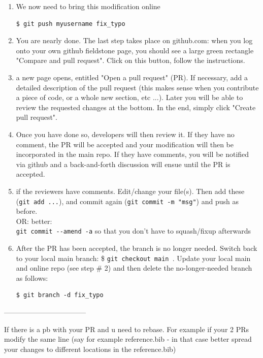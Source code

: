 \begin{enumerate}
\item We now need to bring this modification online 
\begin{verbatim}
$ git push myusername fix_typo
\end{verbatim}

\item You are nearly done. The last step takes place on github.com: when you log onto 
your own github fieldstone page, you should see a large green rectangle "Compare and pull request".
Click on this button, follow the instructions.

\item a new page opens, entitled "Open a pull request" (PR). If necessary, add a detailed description of 
the pull request (this makes sense when you contribute a piece of code, or a whole new section, etc ...).
Later you will be able to review the requested changes at the bottom. In the end, simply click "Create pull request".

\item Once you have done so, \aspect developers will then review it. 
If they have no comment, the PR will be accepted and your modification will 
then be incorporated in the main repo. If they have comments, you will be notified via github and a 
back-and-forth discussion will ensue until the PR is accepted. 

\item if the reviewers have comments. Edit/change your file(s). 
Then add these (\verb'git add ...'), and commit again (\verb'git commit -m "msg"')
and push as before. \\
OR: better: \\
\verb'git commit --amend -a' so that you don't have to squash/fixup afterwards



\item After the PR has been accepted, the branch is no longer needed. Switch back to your local main branch:
\$ \verb"git checkout main ".
Update your local main and online repo (see step \# 2) and then delete the no-longer-needed 
branch as follows:
\begin{verbatim}
$ git branch -d fix_typo
\end{verbatim}
\end{enumerate}

-----------------------------------

If there is a pb with your PR and u need to rebase. For example if your 2 PRs modify the same line (say for example reference.bib - 
in that case better spread your changes to different locations in the reference.bib)

